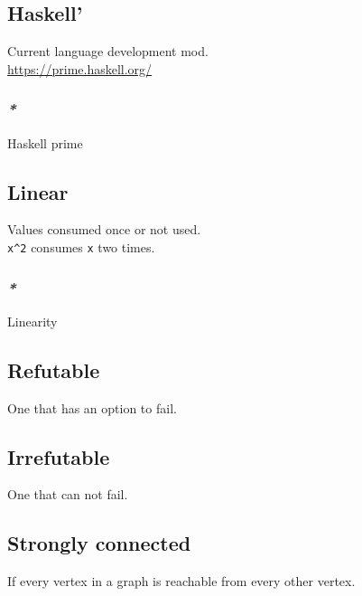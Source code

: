 \documentclass[11pt]{article}
\begin{document}
\subsection{\label{org57efeb3}Haskell'}
\label{sec:org7ec0179}
Current language development mod.\\

\url{https://prime.haskell.org/}\\

\subsubsection{\emph{*}}
\label{sec:org501ddb6}

\label{org3d6a178}Haskell prime\\

\subsection{\label{orgbbe89e9}Linear}
\label{sec:org079a795}
Values consumed once or not used.\\

\texttt{x\textasciicircum{}2} consumes \texttt{x} two times.\\

\subsubsection{\emph{*}}
\label{sec:orgb958997}

\label{orgab4e729}Linearity\\

\subsection{\label{org8610d95}Refutable}
\label{sec:org329d675}
One that has an option to fail.\\

\subsection{\label{org5f9dad8}Irrefutable}
\label{sec:org38052a8}
One that can not fail.\\

\subsection{\label{org9753e4e}Strongly connected}
\label{sec:org9c392d9}
If every vertex in a graph is reachable from every other vertex.\\
\end{document}
